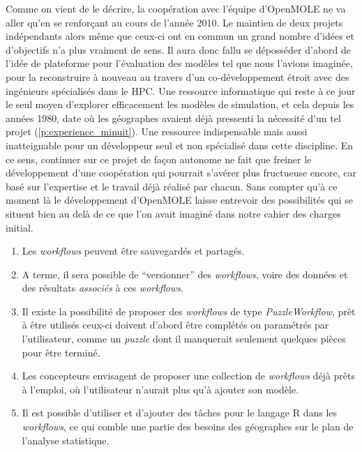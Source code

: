 
Comme on vient de le décrire, la coopération avec l'équipe d'OpenMOLE ne va aller qu'en se renforçant au cours de l'année 2010. Le maintien de deux projets indépendants alors même que ceux-ci ont en commun un grand nombre d'idées et d'objectifs n'a plus vraiment de sens. Il aura donc fallu se déposséder d'abord de l'idée de plateforme pour l'évaluation des modèles tel que nous l'avions imaginée, pour la reconstruire à nouveau au travers d'un co-développement étroit avec des ingénieurs spécialisés dans le HPC. Une ressource informatique qui reste à ce jour le seul moyen d'explorer efficacement les modèles de simulation, et cela depuis les années 1980, date où les géographes avaient déjà pressenti la nécessité d'un tel projet (\ref{p:experience_minuit}). Une ressource indispensable mais aussi inatteignable pour un développeur seul et non spécialisé dans cette discipline. En ce sens, continuer sur ce projet de façon autonome ne fait que freiner le développement d'une coopération qui pourrait s'avérer plus fructueuse encore, car basé sur l'expertise et le travail déjà réalisé par chacun. Sans compter qu'à ce moment là le développement d'OpenMOLE laisse entrevoir des possibilités qui se situent bien au delà de ce que l'on avait imaginé dans notre cahier des charges initial.

\begin{enumerate}[label=(\alph*),labelindent=\parindent,leftmargin=*]
\item Les \textit{workflows} peuvent être sauvegardés et partagés.
\item A terme, il sera possible de \enquote{versionner}  des \textit{workflows}, voire des données et des résultats \textit{associés} à ces \textit{workflows}.
\item Il existe la possibilité de proposer des \textit{workflows} de type \textit{PuzzleWorkflow}, prêt à être utilisés ceux-ci doivent d'abord être complétés ou paramétrés par l'utilisateur, comme un \textit{puzzle} dont il manquerait seulement quelques pièces pour être terminé.
\item Les concepteurs envisagent de proposer une collection de \textit{workflows} déjà prêts à l'emploi, où l'utilisateur n'aurait plus qu'à ajouter son modèle.
\item Il est possible d'utiliser et d'ajouter des tâches pour le langage R dans les \textit{workflows}, ce qui comble une partie des besoins des géographes sur le plan de l'analyse statistique.
\end{enumerate}

